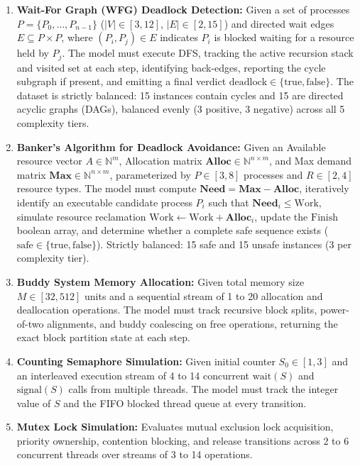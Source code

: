 \documentclass[conference]{IEEEtran}
\begin{document}
\begin{enumerate}
\item \textbf{Wait-For Graph (WFG) Deadlock Detection:} Given a set of processes
  $P = \{P_0, \dots, P_{n-1}\}$ ($|V| \in [3, 12]$, $|E| \in [2, 15]$) and directed wait edges $E \subseteq P \times P$, where
  $(P_i, P_j) \in E$ indicates $P_i$ is blocked waiting for a resource held by $P_j$.
  The model must execute DFS, tracking the active recursion stack and visited set at each
  step, identifying back-edges, reporting the cycle subgraph if present, and emitting a
  final verdict $\text{deadlock} \in \{\text{true}, \text{false}\}$. The dataset is
  strictly balanced: 15 instances contain cycles and 15 are directed acyclic graphs
  (DAGs), balanced evenly (3 positive, 3 negative) across all 5 complexity tiers.

\item \textbf{Banker's Algorithm for Deadlock Avoidance:} Given an Available resource
  vector $A \in \mathbb{N}^m$, Allocation matrix $\mathbf{Alloc} \in \mathbb{N}^{n \times m}$,
  and Max demand matrix $\mathbf{Max} \in \mathbb{N}^{n \times m}$, parameterized by $P \in [3, 8]$ processes
  and $R \in [2, 4]$ resource types. The model must compute $\mathbf{Need} = \mathbf{Max} - \mathbf{Alloc}$,
  iteratively identify an executable candidate process $P_i$ such that $\mathbf{Need}_i \le \text{Work}$,
  simulate resource reclamation $\text{Work} \leftarrow \text{Work} + \mathbf{Alloc}_i$,
  update the $\text{Finish}$ boolean array, and determine whether a complete safe
  sequence exists ($\text{safe} \in \{\text{true}, \text{false}\}$). Strictly balanced:
  15 safe and 15 unsafe instances (3 per complexity tier).

\item \textbf{Buddy System Memory Allocation:} Given total memory size $M \in [32, 512]$ units and a
  sequential stream of 1 to 20 allocation and deallocation operations. The model must track
  recursive block splits, power-of-two alignments, and buddy coalescing on free
  operations, returning the exact block partition state at each step.

\item \textbf{Counting Semaphore Simulation:} Given initial counter $S_0 \in [1, 3]$ and an
  interleaved execution stream of 4 to 14 concurrent $\text{wait}(S)$ and $\text{signal}(S)$
  calls from multiple threads. The model must track the integer value of $S$ and the FIFO
  blocked thread queue at every transition.

\item \textbf{Mutex Lock Simulation:} Evaluates mutual exclusion lock acquisition,
  priority ownership, contention blocking, and release transitions across 2 to 6 concurrent
  threads over streams of 3 to 14 operations.
\end{enumerate}
\end{document}
